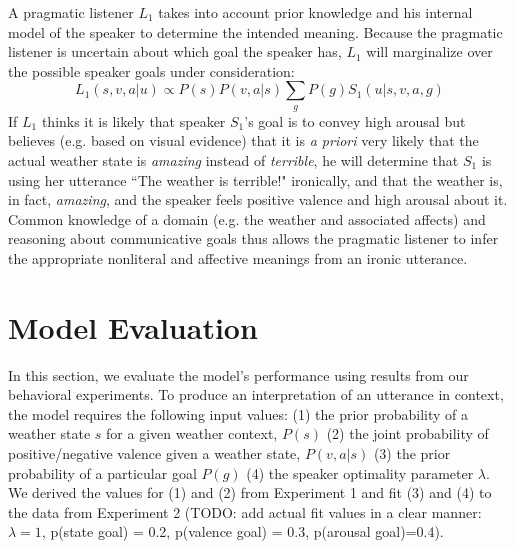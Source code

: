 \documentclass[10pt,letterpaper]{article}
\begin{document}
A pragmatic listener $L_1$ takes into account prior knowledge and his internal model of the speaker to determine the intended meaning. Because the pragmatic listener is uncertain about which goal the speaker has, $L_1$ will marginalize over the possible speaker goals under consideration:
$$
L_1 (s, v, a | u) \propto P(s) P(v, a | s) \sum_{g}{P (g) S_1 (u|s, v, a, g)}
$$
If $L_1$ thinks it is likely that speaker $S_1$'s goal is to convey high arousal but believes (e.g. based on visual evidence) that it is \emph{a priori} very likely that the actual weather state is \emph{amazing} instead of \emph{terrible}, he will determine that $S_1$ is using her utterance ``The weather is terrible!" ironically, and that the weather is, in fact, \emph{amazing}, and the speaker feels positive valence and high arousal about it. Common knowledge of a domain (e.g. the weather and associated affects) and reasoning about communicative goals thus allows the pragmatic listener to infer the appropriate nonliteral and affective meanings from an ironic utterance.

\section{Model Evaluation}
In this section, we evaluate the model's performance using results from our behavioral experiments. To produce an interpretation of an utterance in context, the model requires the following input values: (1) the prior probability of a weather state $s$ for a given weather context, $P(s)$ (2) the joint probability of positive/negative valence given a weather state, $P(v, a | s)$ (3) the prior probability of a particular goal $P(g)$ (4) the speaker optimality parameter $\lambda$. We derived the values for (1) and (2) from Experiment 1 and fit (3) and (4) to the data from Experiment 2 (TODO: add actual fit values in a clear manner: $\lambda=1$, p(state goal) = 0.2, p(valence goal) = 0.3, p(arousal goal)=0.4).
\end{document}
